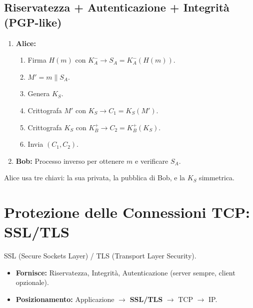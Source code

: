 \documentclass{article}
\begin{document}
\subsection{Riservatezza + Autenticazione + Integrità (PGP-like)}
\begin{enumerate}
    \item \textbf{Alice:}
    \begin{enumerate}
        \item Firma $H(m)$ con $K_A^- \rightarrow S_A = K_A^-(H(m))$.
        \item $M' = m \mathbin{\|} S_A$.
        \item Genera $K_S$.
        \item Crittografa $M'$ con $K_S \rightarrow C_1 = K_S(M')$.
        \item Crittografa $K_S$ con $K_B^+ \rightarrow C_2 = K_B^+(K_S)$.
        \item Invia $(C_1, C_2)$.
    \end{enumerate}
    \item \textbf{Bob:}
    Processo inverso per ottenere $m$ e verificare $S_A$.
\end{enumerate}
Alice usa tre chiavi: la sua privata, la pubblica di Bob, e la $K_S$ simmetrica.

\section{Protezione delle Connessioni TCP: SSL/TLS}
\label{sec:ssl_tls}
SSL (Secure Sockets Layer) / TLS (Transport Layer Security).

\begin{itemize}
    \item \textbf{Fornisce:} Riservatezza, Integrità, Autenticazione (server sempre, client opzionale).
    \item \textbf{Posizionamento:} Applicazione $\rightarrow$ \textbf{SSL/TLS} $\rightarrow$ TCP $\rightarrow$ IP.
\end{itemize}
\end{document}
